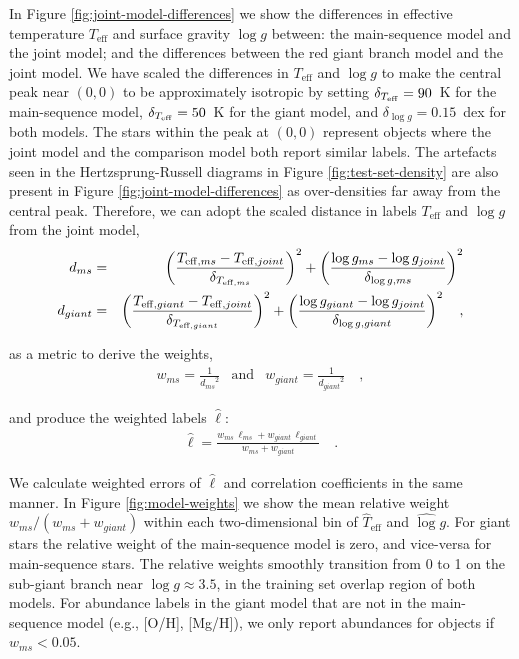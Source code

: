 \documentclass[preprint,trackchanges]{aastex}
\newcommand{\teff}{T_{\mathrm{eff}}}
\newcommand{\logg}{\log g}
\begin{document}
In Figure \ref{fig:joint-model-differences} we show the differences in effective temperature
$\teff$ and surface gravity $\logg$ between: the main-sequence model and the joint
model; and the differences between the red giant branch model and the joint model. We have scaled
the differences in $\teff$ and $\logg$ to make the central peak near $(0, 0)$ to 
be approximately isotropic by setting
	$\delta_{T_{\rm eff}} = 90$~K for the main-sequence model, 
	$\delta_{T_{\rm eff}} = 50$~K for the giant model, and 
	$\delta_{\log{g}} = 0.15$~dex for both models.
The stars within the peak at $(0, 0)$ represent objects where
the joint model and the comparison model both report similar labels.  The artefacts 
seen in the Hertzsprung-Russell diagrams in Figure \ref{fig:test-set-density} are
also present in Figure \ref{fig:joint-model-differences} as over-densities far away
from the central peak.  Therefore, we can 
adopt the scaled distance in labels $\teff$ and $\logg$ from the joint model,
\begin{eqnarray}
	d_{ms} & = & \left(\frac{T_{{\rm eff},ms} - T_{{\rm eff},joint}}{\delta_{T_{{\rm eff},ms}}}\right)^2 + \left(\frac{\log{g}_{ms} - \log{g}_{joint}}{\delta_{\log{g},ms}}\right)^2   \nonumber \\
	d_{giant} & = & \left(\frac{T_{{\rm eff},giant} - T_{{\rm eff},joint}}{\delta_{T_{{\rm eff},giant}}}\right)^2 + \left(\frac{\log{g}_{giant} - \log{g}_{joint}}{\delta_{\log{g},giant}}\right)^2   \quad ,
\end{eqnarray}

\noindent{}as a metric to derive the weights,
\begin{eqnarray}
	w_{ms} = \frac{1}{{d_{ms}}^2} & \text{and} & w_{giant} = \frac{1}{{d_{giant}}^2} \quad ,
\end{eqnarray}

\noindent{}and produce the weighted labels $\hat\ell$:
\begin{eqnarray}
	\hat\ell = \frac{w_{ms}\,\ell_{ms} + w_{giant}\,\ell_{giant}}{w_{ms} + w_{giant}} \quad .
\end{eqnarray}

We calculate weighted errors of $\hat\ell$ and correlation coefficients in 
the same manner.  In Figure \ref{fig:model-weights} we show the mean relative
weight $w_{ms}/(w_{ms} + w_{giant})$ within each two-dimensional bin of 
$\hat\teff$ and $\hat\logg$.  For giant stars the relative weight of 
the main-sequence model is zero, and vice-versa for main-sequence stars.
The relative weights smoothly transition from 0 to 1 on the sub-giant branch
near $\log{g} \approx 3.5$, in the training set overlap region of both models.
For abundance labels in the giant model that are not in the main-sequence
model (e.g., [O/H], [Mg/H]), we only report abundances for objects if
$w_{ms} < 0.05$.
\end{document}
